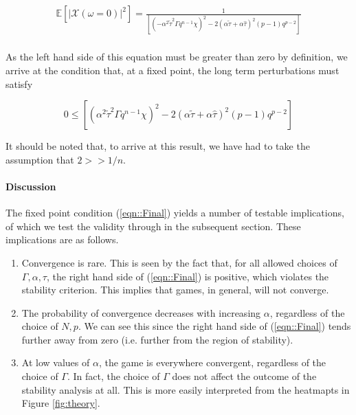 \documentclass[sigconf]{aamas}
\newcommand{\ttau}{\tilde{\tau}}
\newcommand{\htau}{\hat{\tau}}
\begin{document}
\begin{equation}
\begin{split}
        \mathbb{E}[|\mathcal{X}(\omega = 0)|^2] = \frac{1}{\left[ (-\alpha^2 \ttau^2 \Gamma q^{n-1} \chi)^2 - 2 (\alpha \ttau + \alpha \htau)^2 (p-1)q^{p-2}\right]} \\
\end{split}
\end{equation}

As the left hand side of this equation must be greater than zero by definition, we arrive at the condition that, at a fixed point, the long term perturbations must satisfy

\begin{equation}
    \label{eqn::Final}
    0 \leq \left [(\alpha^2 \ttau^2 \Gamma q^{n-1} \chi)^{2} - 2 (\alpha \ttau + \alpha \htau)^2 (p-1)q^{p-2} \right ]
\end{equation}

It should be noted that, to arrive at this result, we have had to take the assumption that $2 >> 1/n$. 


\paragraph{Discussion}
The fixed point condition (\ref{eqn::Final}) yields a number of testable implications, of which we test the validity through in the subsequent section. These implications are as follows.

\begin{enumerate}
    \item Convergence is rare. This is seen by the fact that, for all allowed choices of $\Gamma, \alpha, \tau$, the right hand side of (\ref{eqn::Final}) is positive, which violates the stability criterion. This implies that games, in general, will not converge.
    \item The probability of convergence decreases with increasing $\alpha$, regardless of the choice of $N, p$. We can see this since the right hand side of (\ref{eqn::Final}) tends further away from zero (i.e. further from the region of stability).
    \item At low values of $\alpha$, the game is everywhere convergent, regardless of the choice of $\Gamma$. In fact, the choice of $\Gamma$ does not affect the outcome of the stability analysis at all. This is more easily interpreted from the heatmapts in Figure \ref{fig:theory}.
\end{enumerate}
\end{document}
